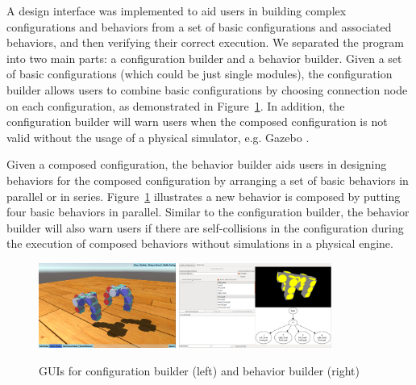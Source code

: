 \documentclass[graybox]{svmult}
\newcommand{\TODO}[1]{ {\bf \textcolor{red}{TODO:} #1 }}
\begin{document}

A design interface was implemented to aid users in building complex configurations and behaviors from a set of basic configurations and associated behaviors,
and then verifying their correct execution. We separated the program into two main parts: a configuration builder and a behavior builder.
Given a set of basic configurations (which could be just single modules), the configuration builder allows users to combine basic configurations by choosing connection node on each configuration, as demonstrated in Figure~\ref{fig:smores_conf}. In addition, the configuration builder will warn users when the composed configuration is not valid without the usage of a physical simulator, e.g. Gazebo
\cite{koenig2004design}.

Given a composed configuration, the behavior builder aids users in designing behaviors for the composed configuration by arranging a set of basic behaviors in parallel or in series. Figure~\ref{fig:smores_conf} illustrates a new behavior is composed by putting four basic behaviors in parallel. Similar to the configuration builder, the behavior builder will also warn users if there are self-collisions in the configuration during the execution of composed behaviors without simulations in a physical engine.

\begin{figure}
\begin{center}
    \includegraphics[height=1.1in]{images/library/unity/config_designer.png}
    \includegraphics[height=1.1in]{images/gait_window.png}
    \caption{GUIs for configuration builder (left) and behavior builder (right)}
    \label{fig:smores_conf}
\end{center}
\end{figure}
\end{document}
